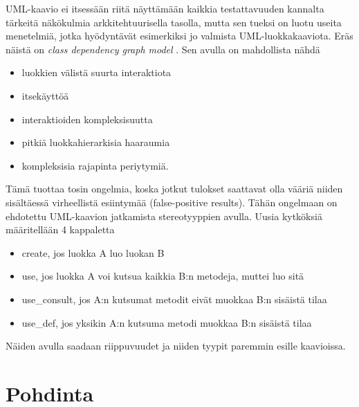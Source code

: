 \documentclass[finnish]{tktltiki2}
\theoremstyle{definition}
\theoremstyle{remark}
\begin{document}
UML-kaavio ei itsessään riitä näyttämään kaikkia testattavuuden kannalta tärkeitä näkökulmia arkkitehtuurisella tasolla, mutta sen tueksi on luotu useita menetelmiä, jotka hyödyntävät esimerkiksi jo valmista UML-luokkakaaviota. Eräs näistä on \textit{class dependency graph model} \citep[s. 4]{baudry_testability_2002}. Sen avulla on mahdollista nähdä 

\begin{itemize}
	\item luokkien välistä suurta interaktiota
	\item itsekäyttöä
	\item interaktioiden kompleksisuutta
	\item pitkiä luokkahierarkisia haaraumia
	\item kompleksisia rajapinta periytymiä.
\end{itemize}



Tämä tuottaa tosin ongelmia, koska jotkut tulokset saattavat olla vääriä niiden sisältäessä virheellistä esiintymää (false-positive results). Tähän ongelmaan on ehdotettu UML-kaavion jatkamista stereotyyppien avulla. Uusia kytköksiä määritellään 4 kappaletta \citep[s. 4]{baudry_measuring_2003}

\begin{itemize}
	\item create, jos luokka A luo luokan B
	\item use, jos luokka A voi kutsua kaikkia B:n metodeja, muttei luo sitä
	\item use\_consult, jos A:n kutsumat metodit eivät muokkaa B:n sisäistä tilaa
	\item use\_def, jos yksikin A:n kutsuma metodi muokkaa B:n sisäistä tilaa
\end{itemize}

\noindent
Näiden avulla saadaan riippuvuudet ja niiden tyypit paremmin esille kaavioissa. 





\section{Pohdinta}
\end{document}
